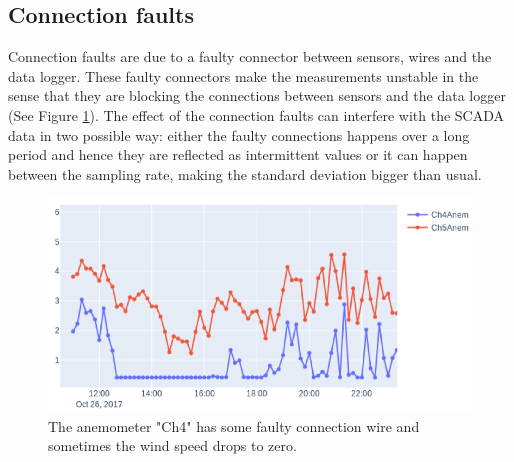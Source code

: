 \documentclass[journal]{IEEEtran}
\begin{document}
\subsection{Connection faults}
Connection faults are due to a faulty connector between sensors, wires and the data logger. These faulty connectors make the measurements unstable in the sense that they are blocking the connections between sensors and the data logger (See Figure \ref{fig:connectionFaults}). The effect of the connection faults can interfere with the SCADA data in two possible way: either the faulty connections happens over a long period and hence they are reflected as intermittent values or it can happen between the sampling rate, making the standard deviation bigger than usual. \begin{figure}[h]
	\centering
	\includegraphics[width=\columnwidth]{Images/ConnectionFaults.png}
	\caption{The anemometer "Ch4" has some faulty connection wire and sometimes the wind speed drops to zero.}
	\label{fig:connectionFaults}
\end{figure}
\end{document}
